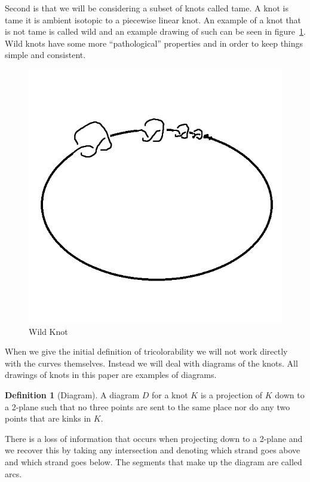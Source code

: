 \documentclass[12pt]{amsart}
\theoremstyle{definition}
\newtheorem{definition}[theorem]{Definition}
\theoremstyle{remark}
\numberwithin{equation}{section}
\newcommand{\ds}{.3}
\begin{document}
Second is that we will be considering a subset of knots called tame. A knot
is tame it is ambient isotopic to a piecewise linear knot. An example of
a knot that is not tame is called wild and an example drawing of such can be
seen in figure~\ref{fig:wild}. Wild knots have some more ``pathological''
properties and in order to keep things simple and consistent.

\begin{figure}
  \includegraphics[scale=\ds]{wild}
  \caption{Wild Knot}
  \label{fig:wild}
\end{figure}

When we give the initial definition of  tricolorability we will not work
directly with the curves themselves. Instead we will deal with diagrams
of the knots. All drawings of knots in this paper are examples of diagrams.

\begin{definition}[Diagram]
  A diagram $D$ for a knot $K$ is a projection of $K$ down to a 2-plane
  such that no three points are sent to the same place nor do any two
  points that are kinks in $K$.
\end{definition}

There is a loss of information that occurs when projecting down to a 2-plane
and we recover this by taking any intersection and denoting which strand
goes above and which strand goes below. The segments that make up the
diagram are called arcs.
\end{document}
